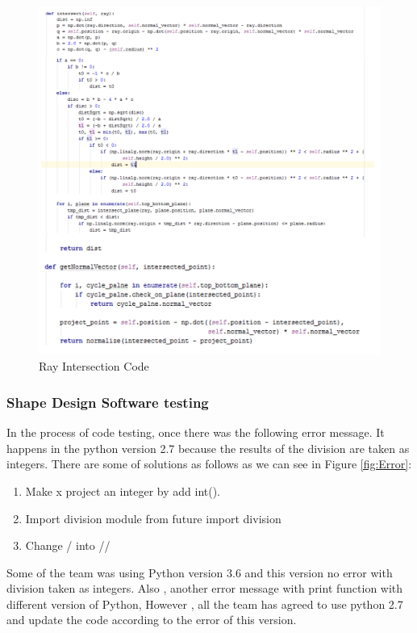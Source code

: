 \documentclass[a4paper, 12pt]{article}
\begin{document}
\begin{figure}[ht]  
\centering
\includegraphics[scale=0.6]{ShD_ray_intersection_code.png}
	\caption{Ray Intersection Code}
	\label{fig:RayIntersection}
\end{figure}


\subsubsection{Shape Design Software testing}
In the process of code testing, once there was the following error message. It happens in the python version 2.7 because the results of the division are taken as integers. There are some of solutions as follows as we can see in Figure \ref{fig:Error}:

\begin{enumerate}
\item Make x project an integer by add int().
\item Import division module from future import division
\item Change / into //
\end{enumerate}


Some of the team was using Python version 3.6 and this version no error with division taken as integers. Also , another error message with print function with different version of Python, However , all the team has agreed to use python 2.7 and update the code according to the error of this version.
\end{document}
